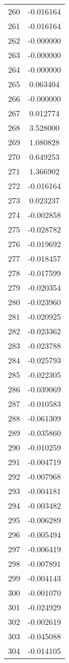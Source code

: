 \documentclass[12pt]{article}
\begin{document}
\begin{longtable}{@{}cc@{}}
260 & -0.016164 \\
261 & -0.016164 \\
262 & -0.000000 \\
263 & -0.000000 \\
264 & -0.000000 \\
265 & 0.063404 \\
266 & -0.000000 \\
267 & 0.012774 \\
268 & 3.528000 \\
269 & 1.080828 \\
270 & 0.649253 \\
271 & 1.366902 \\
272 & -0.016164 \\
273 & 0.023237 \\
274 & -0.002858 \\
275 & -0.028782 \\
276 & -0.019692 \\
277 & -0.018457 \\
278 & -0.017599 \\
279 & -0.020354 \\
280 & -0.023960 \\
281 & -0.020925 \\
282 & -0.023362 \\
283 & -0.023788 \\
284 & -0.025793 \\
285 & -0.022305 \\
286 & -0.039069 \\
287 & -0.010583 \\
288 & -0.061309 \\
289 & -0.035860 \\
290 & -0.010259 \\
291 & -0.004719 \\
292 & -0.007968 \\
293 & -0.004181 \\
294 & -0.003482 \\
295 & -0.006289 \\
296 & -0.005494 \\
297 & -0.006419 \\
298 & -0.007891 \\
299 & -0.004143 \\
300 & -0.001070 \\
301 & -0.024929 \\
302 & -0.002619 \\
303 & -0.045088 \\
304 & -0.014105 \\

\end{longtable}
\end{document}
